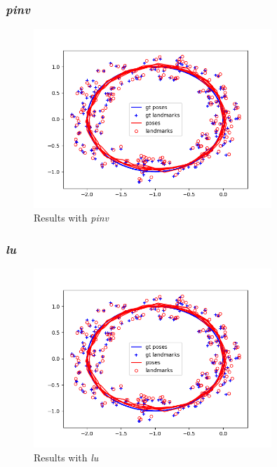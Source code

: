 \documentclass[12pt, a4paper]{article}
\begin{document}
\subsubsection{\textit{pinv}}
\begin{figure}[H]
  \centering
  \includegraphics[width=0.8\textwidth]{./results/linear/pinv_2d_linear_loop_map.png}
  \caption{Results with \textit{pinv}}
\end{figure}
\subsubsection{\textit{lu}}
\begin{figure}[H]
  \centering
  \includegraphics[width=0.8\textwidth]{./results/linear/lu_2d_linear_loop_map.png}
  \caption{Results with \textit{lu}}
\end{figure}
\end{document}
